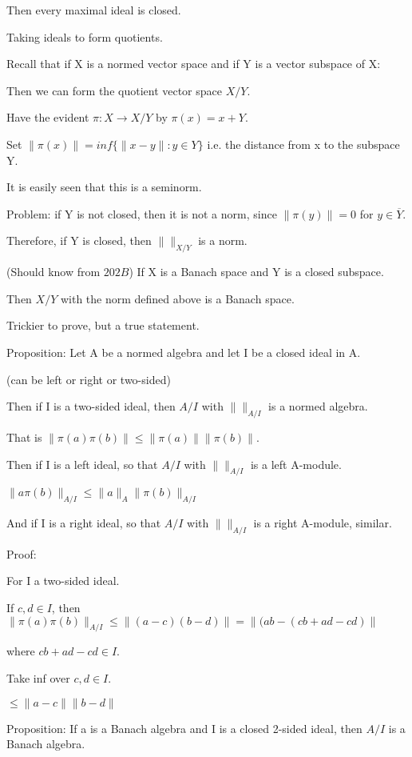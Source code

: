 \documentclass[12pt]{article}
\begin{document}
Then every maximal ideal is closed.

\noindent
Taking ideals to form quotients.

Recall that if X is a normed vector space and if Y is a vector subspace of X:

Then we can form the quotient vector space $X \slash Y$.

Have the evident $\pi: X \to X \slash Y$ by $\pi (x) = x + Y$.

Set $\|\pi(x)\| = inf\{\|x - y\| : y \in Y\}$ i.e. the distance from x to the subspace Y.

It is easily seen that this is a seminorm.

Problem: if Y is not closed, then it is not a norm, since $\|\pi(y)\| = 0$ for $y \in \overline{Y}$.

Therefore, if Y is closed, then $\|\|_{X \slash Y}$ is a norm.

\noindent
(Should know from $202B$) If X is a Banach space and Y is a closed subspace.

Then $X \slash Y$ with the norm defined above is a Banach space.

Trickier to prove, but a true statement.

\noindent
Proposition: Let A be a normed algebra and let I be a closed ideal in A.

(can be left or right or two-sided)

Then if I is a two-sided ideal, then $A \slash I$ with $\|\|_{A \slash I}$ is a normed algebra.

That is $\|\pi(a)\pi(b)\| \leq \|\pi(a)\|\|\pi(b)\|$.

Then if I is a left ideal, so that $A \slash I$ with $\|\|_{A \slash I}$ is a left A-module.

$\|a\pi(b)\|_{A \slash I} \leq \|a\|_A\|\pi(b)\|_{A\slash I}$

And if I is a right ideal, so that $A \slash I$ with $\|\|_{A \slash I}$ is a right A-module, similar.

\noindent
Proof:

For I a two-sided ideal.

If $c, d \in I$, then $\|\pi(a)\pi(b)\|_{A \slash I} \leq \|(a - c)(b - d)\| = \|(ab - (cb + ad - cd)\|$

where $cb + ad - cd \in I$.

Take inf over $c, d \in I$.

$\leq \|a - c\| \|b - d\|$

\noindent
Proposition: If a is a Banach algebra and I is a closed 2-sided ideal, then $A\slash I$ is a Banach algebra.
\end{document}
